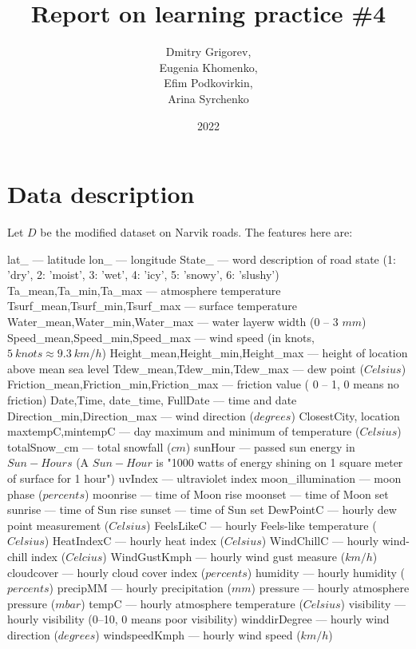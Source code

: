 \documentclass[12pt, bachelor, substylefile = algo_title.rtx]{disser}
\theoremstyle{definition}
\begin{document}
\title{Report on learning practice \#4}


\author{Dmitry Grigorev,\\ Eugenia Khomenko,\\ Efim Podkovirkin,\\ Arina Syrchenko}

\date{2022}

\maketitle

\tableofcontents

\section{Data description}

Let $D$ be the modified dataset on Narvik roads. The features here are:

\begin{outline}
\1lat\_ — latitude
\1 lon\_ — longitude
\1 State\_ — word description of road state (1: 'dry', 2: 'moist', 3: 'wet', 4: 'icy', 5: 'snowy', 6: 'slushy')
\1 Ta\_mean,Ta\_min,Ta\_max — atmosphere temperature
\1 Tsurf\_mean,Tsurf\_min,Tsurf\_max — surface temperature
\1 Water\_mean,Water\_min,Water\_max — water layerw width (0 -- 3 $mm$)
\1 Speed\_mean,Speed\_min,Speed\_max — wind speed (in knots, $5\ knots \approx 9.3\ km/h$)
\1 Height\_mean,Height\_min,Height\_max — height of location above mean sea level
\1 Tdew\_mean,Tdew\_min,Tdew\_max — dew point ($Celsius$)
\1 Friction\_mean,Friction\_min,Friction\_max — friction value ( 0 -- 1, 0 means no friction)
\1 Date,Time, date\_time, FullDate — time and date
\1 Direction\_min,Direction\_max — wind direction ($degrees$)
\1 ClosestCity, location
\1 maxtempC,mintempC — day maximum and minimum of temperature ($Celsius$)
\1 totalSnow\_cm — total snowfall ($cm$)
\1 sunHour — passed sun energy in $Sun-Hours$ (A $Sun-Hour$ is "1000 watts of energy shining on 1 square meter of surface for 1 hour")
\1 uvIndex — ultraviolet index
\1 moon\_illumination — moon phase ($percents$)
\1 moonrise — time of Moon rise
\1 moonset — time of Moon set
\1 sunrise — time of Sun rise
\1 sunset — time of Sun set
\1 DewPointC — hourly dew point measurement ($Celsius$)
\1 FeelsLikeC — hourly Feels-like temperature ($Celsius$)
\1 HeatIndexC — hourly heat index ($Celsius$)
\1 WindChillC — hourly wind-chill index ($Celcius$) 
\1 WindGustKmph — hourly wind gust measure ($km/h$)
\1 cloudcover — hourly cloud cover index ($percents$)
\1 humidity — hourly humidity ($percents$)
\1 precipMM — hourly precipitation ($mm$)
\1 pressure — hourly atmosphere pressure ($mbar$)
\1 tempC — hourly atmosphere temperature ($Celsius$)
\1 visibility — hourly visibility (0--10, 0 means poor visibility)
\1 winddirDegree — hourly wind direction ($degrees$)
\1 windspeedKmph — hourly wind speed ($km/h$)
\end{outline}
\end{document}
